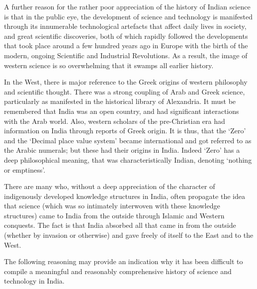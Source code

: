 A further reason for the rather poor appreciation of the history of Indian science is that in the public eye, the development of science and technology is manifested through its innumerable technological artefacts that affect daily lives in society, and great scientific discoveries, both of which rapidly followed the developments that took place around a few hundred years ago in Europe with the birth of the modern, ongoing Scientific and Industrial Revolutions. As a result, the image of western science is so overwhelming that it swamps all earlier history.

In the West, there is major reference to the Greek origins of western philosophy and scientific thought. There was a strong coupling of Arab and Greek science, particularly as manifested in the historical library of Alexandria. It must be remembered that India was an open country, and had significant interactions with the Arab world. Also, western scholars of the pre-Christian era had information on India through reports of Greek origin. It is thus, that the ‘Zero’ and the ‘Decimal place value system’ became international and got referred to as the Arabic numerals; but these had their origins in India. Indeed ‘Zero’ has a deep philosophical meaning, that was characteristically Indian, denoting ‘nothing or emptiness’.

There are many who, without a deep appreciation of the character of indigenously developed knowledge structures in India, often propagate the idea that science (which was so intimately interwoven with these knowledge structures) came to India from the outside through Islamic and Western conquests. The fact is that India absorbed all that came in from the outside (whether by invasion or otherwise) and gave freely of itself to the East and to the West.

The following reasoning may provide an indication why it has been difficult to compile a meaningful and reasonably comprehensive history of science and technology in India.

\newpage

